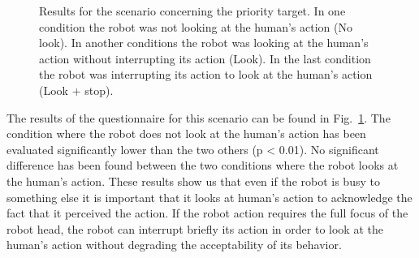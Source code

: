 \documentclass[english,a4paper,11pt,twoside]{StyleThese}
\begin{document}
\begin{figure}[!h]
\centering
    \caption{Results for the scenario concerning the priority target. In one condition the robot was not looking at the human's action (No look). In another conditions the robot was looking at the human's action without interrupting its action (Look). In the last condition the robot was interrupting its action to look at the human's action (Look + stop).}
    \label{fig:resSce6}
\end{figure}

The results of the questionnaire for this scenario can be found in Fig.~\ref{fig:resSce6}. The condition where the robot does not look at the human's action has been evaluated significantly lower than the two others (p < 0.01). No significant difference has been found between the two conditions where the robot looks at the human's action. These results show us that even if the robot is busy to something else it is important that it looks at human's action to acknowledge the fact that it perceived the action. If the robot action requires the full focus of the robot head, the robot can interrupt briefly its action in order to look at the human's action without degrading the acceptability of its behavior.
\end{document}
